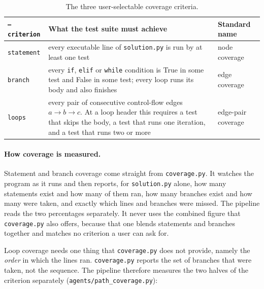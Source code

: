 \documentclass[11pt,a4paper]{article}
\begin{document}
\begin{table}[htbp]
\centering
\small
\caption{The three user-selectable coverage criteria.}
\label{tab:criteria}
\begin{tabular}{@{}p{1.7cm}p{8.6cm}p{2.6cm}@{}}
\toprule
\textbf{\texttt{--criterion}} & \textbf{What the test suite must achieve} & \textbf{Standard name} \\
\midrule
\texttt{statement} & every executable line of \texttt{solution.py} is run by at least one test & node coverage \\
\texttt{branch} & every \texttt{if}, \texttt{elif} or \texttt{while} condition is True in some test and False
in some test; every loop runs its body and also finishes & edge coverage \\
\texttt{loops} & every pair of consecutive control-flow edges $a \rightarrow b \rightarrow c$. At a loop
header this requires a test that skips the body, a test that runs one iteration, and a test that runs two or
more & edge-pair coverage \\
\bottomrule
\end{tabular}
\end{table}

\paragraph{How coverage is measured.} Statement and branch coverage come straight from
\texttt{coverage.py}. It watches the program as it runs and then reports, for \texttt{solution.py} alone, how
many statements exist and how many of them ran, how many branches exist and how many were taken, and exactly
which lines and branches were missed. The pipeline reads the two percentages separately. It never uses the
combined figure that \texttt{coverage.py} also offers, because that one blends statements and branches together
and matches no criterion a user can ask for.

Loop coverage needs one thing that \texttt{coverage.py} does not provide, namely the \emph{order} in which the
lines ran. \texttt{coverage.py} reports the set of branches that were taken, not the sequence. The pipeline
therefore measures the two halves of the criterion separately (\texttt{agents/path\_coverage.py}):
\end{document}
